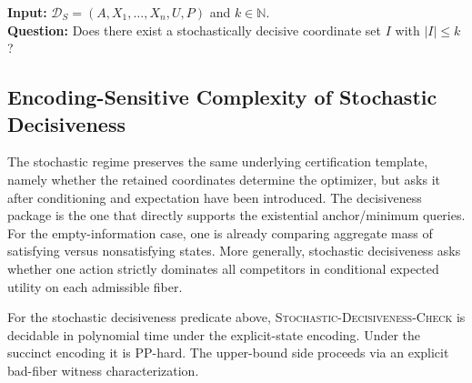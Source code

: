 \begin{problem}\label{prob:stochastic-minimum-sufficient}
\textbf{Input:} $\mathcal{D}_S=(A,X_1,\ldots,X_n,U,P)$ and $k\in\mathbb{N}$. \\
\textbf{Question:} Does there exist a stochastically decisive coordinate set $I$ with $|I|\le k$?
\end{problem}

\subsection{Encoding-Sensitive Complexity of Stochastic Decisiveness}

The stochastic regime preserves the same underlying certification template, namely whether the retained coordinates determine the optimizer, but asks it after conditioning and expectation have been introduced. The decisiveness package is the one that directly supports the existential anchor/minimum queries. For the empty-information case, one is already comparing aggregate mass of satisfying versus nonsatisfying states. More generally, stochastic decisiveness asks whether one action strictly dominates all competitors in conditional expected utility on each admissible fiber.

\begin{theorem}\label{thm:stochastic-pp}
For the stochastic decisiveness predicate above, \textsc{Stochastic-Decisiveness-Check} is decidable in polynomial time under the explicit-state encoding. Under the succinct encoding it is PP-hard. The upper-bound side proceeds via an explicit bad-fiber witness characterization.
\end{theorem}


